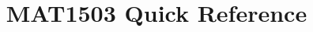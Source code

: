 \documentclass[11pt, a4paper]{book}
\title{MAT1503 Quick Reference}
\author{ }
\begin{document}
	\begin{titlepage}
		\maketitle
	\end{titlepage}
	\clearpage\begingroup\pagestyle{empty}\cleardoublepage\endgroup
	\tableofcontents
\end{document}
